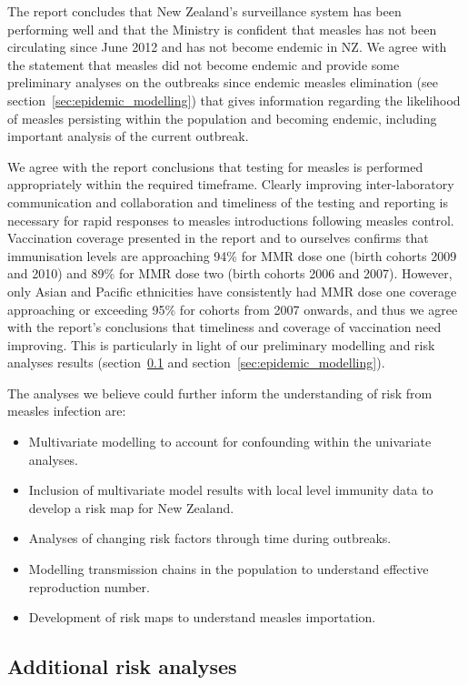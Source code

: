 \documentclass{article}
\begin{document}
The report concludes that New Zealand's surveillance system has been performing well and that the Ministry is confident that measles has not been circulating since June 2012 and has not become endemic in NZ. We agree with the statement that measles did not become endemic and provide some preliminary analyses on the outbreaks since endemic measles elimination (see section~\ref{sec:epidemic_modelling}) that gives information regarding the likelihood of measles persisting within the population and becoming endemic, including important analysis of the current outbreak.

We agree with the report conclusions that testing for measles is performed appropriately within the required timeframe. Clearly improving inter-laboratory communication and collaboration and timeliness of the testing and reporting is necessary for rapid responses to measles introductions following measles control. Vaccination coverage presented in the report and to ourselves confirms that immunisation levels are approaching 94\% for MMR dose one (birth cohorts 2009 and 2010) and 89\% for MMR dose two (birth cohorts 2006 and 2007). However, only Asian and Pacific ethnicities have consistently had MMR dose one coverage approaching or exceeding 95\% for cohorts from 2007 onwards, and thus we agree with the report's conclusions that timeliness and coverage of vaccination need improving. This is particularly in light of our preliminary modelling and risk analyses results (section~\ref{sub:risk_analyses} and section~\ref{sec:epidemic_modelling}).

The analyses we believe could further inform the understanding of risk from measles infection are:
\begin{itemize}
\item Multivariate modelling to account for confounding within the univariate analyses.
\item Inclusion of multivariate model results with local level immunity data to develop a risk map for New Zealand.
\item Analyses of changing risk factors through time during outbreaks.
\item Modelling transmission chains in the population to understand effective reproduction number.
\item Development of risk maps to understand measles importation.
\end{itemize}

\subsection{Additional risk analyses}
\label{sub:risk_analyses}
\end{document}
